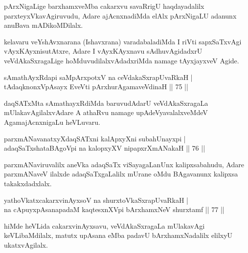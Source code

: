 \begin{artha}
pArxNigaLige barxhamxveMba cakarxvu savaRrigU haqdayadalilx parxteyxVkavAgiruvudu, Adare ajAcnxnadiMda elAlx pArxNigaLU adanunx anuBava mADikoMDilalx.
\end{artha}

\begin{artha}
kelavaru veYshAvxnarana (Ishavxrana) varadabaladiMda I riVti sapxSaTxvAgi vAyxKAyxnisutAtxre, Adare I vAyxKAyxnavu sAdhuvAgidadxrU veVdAkaSxragaLige hoMduvudilalxvAdadxriMda namage tAyxjayxveV Agide.
\end{artha}


\begin{shl}
sAmathAyxRdapi saMpArxpotxV na ceVdakaSxrapUvaRkaH |\\
tAdaqknonxVpAsayx EveVti pArxhurAgamaveVdinaH \hfill || 75 ||
\end{shl}

\begin{artha}
daqSATxMta sAmathayxRdiMda baruvudAdarU veVdAkaSxragaLa mUlakavAgilalxvAdare A athaRvu namage upAdeVyavalalxveMdeV AgamajAcnxnigaLu heVLuvaru.
\end{artha}

\begin{shl}
parxmANavanatxyXdaqSATxni kalApxyXni subahUnayxpi |\\
adaqSaTxshataBAgoV\s pi na kalopxyXV nipapxrXmANakaH \hfill || 76 ||
\end{shl}

\begin{artha}
parxmANaviruvalilx aneVka adaqSaTx viSayagaLanUnx kalipxsabahudu, Adare parxmANaveV ilalxde adaqSaTxgaLalilx mUrane oMdu BAgavanunx kalipxsa takakxdadxlalx.
\end{artha}


\begin{shl}
yathoVkatxcakarxvinAyxsoV na shurxtoV\s kaSxrapUvaRkaH |\\
na cApuyxpAsanapadaM kaqtesxnXV\s pi bArxhamxNeV shurxtamf \hfill || 77 ||
\end{shl}

\begin{artha}
hiMde heVLida cakarxvinAyxsavu, veVdAkaSxragaLa mUlakavAgi keVLibaMdilalx, matutx upAsana eMba padavU bArxhamxNadalilx elilxyU ukatxvAgilalx.
\end{artha}

